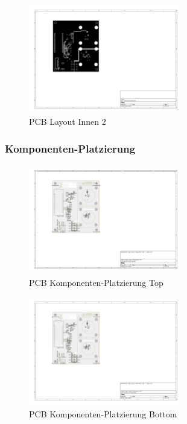 \begin{figure}[H]
    \centering
    \includegraphics[trim=130 220 450 80, clip, width=0.6\textwidth]{attachments/pcb_In2_Cu.pdf}
    \caption{PCB Layout Innen 2}\label{fig:pcb_in2_cu}
\end{figure}

\subsubsection{Komponenten-Platzierung}

\begin{figure}[H]
    \centering
    \includegraphics[page=1, trim=120 220 450 80, clip, width=0.6\textwidth]{attachments/pcb_placement.pdf}
    \caption{PCB Komponenten-Platzierung Top}\label{fig:pcb_placement_1}
\end{figure}

\begin{figure}[H]
    \centering
    \includegraphics[page=2, trim=450 220 120 80, clip, width=0.6\textwidth]{attachments/pcb_placement.pdf}
    \caption{PCB Komponenten-Platzierung Bottom}\label{fig:pcb_placement_2}
\end{figure}

